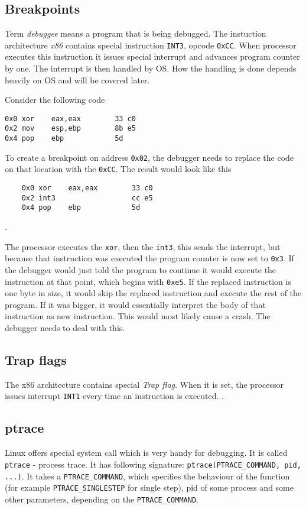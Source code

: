 \subsection{Breakpoints}
Term \textit{debuggee} means a program that is being debugged. The instuction architecture \textit{x86} contains special instruction \lstinline{INT3}, opcode \lstinline{0xCC}. When processor executes this instruction it issues special interrupt and advances program counter by one. The interrupt is then handled by OS. How the handling is done depends heavily on OS and will be covered later. 

Consider the following code
\begin{lstlisting}
0x0 xor    eax,eax        33 c0
0x2 mov    esp,ebp        8b e5
0x4 pop    ebp            5d
\end{lstlisting}

To create a breakpoint on address \lstinline{0x02}, the debugger needs to replace the code on that location with the \lstinline{0xCC}. The result would look like this

\begin{lstlisting}
    0x0 xor    eax,eax        33 c0
    0x2 int3                  cc e5
    0x4 pop    ebp            5d
\end{lstlisting}.

The processor executes the \lstinline{xor}, then the \lstinline{int3}, this sends the interrupt, but because that instruction was executed the program counter is now set to \lstinline{0x3}. If the debugger would just told the program to continue it would execute the instruction at that point, which begins with \lstinline{0xe5}. If the replaced instruction is one byte in size, it would skip the replaced instruction and execute the rest of the program. If it was bigger, it would essentially interpret the body of that instruction as new instruction. This would most likely cause a crash. The debugger needs to deal with this. 

\subsection{Trap flags}
The x86 architecture contains special \textit{Trap flag}. When it is set, the processor issues interrupt \texttt{INT1} every time an instruction is executed. .

\subsection{ptrace}
Linux offers special system call which is very handy for debugging. It is called \lstinline{ptrace} \cite{ptrace} - process trace. It has following signature: \lstinline{ptrace(PTRACE_COMMAND, pid, ...)}. It takes a \lstinline{PTRACE_COMMAND}, which specifies the behaviour of the function (for example \lstinline{PTRACE_SINGLESTEP} for single step), pid of some process and some other parameters, depending on the \lstinline{PTRACE_COMMAND}. 

